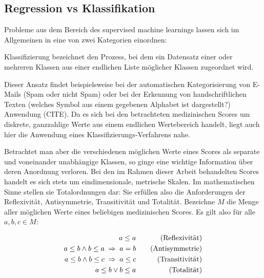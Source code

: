 \subsection{Regression vs Klassifikation}\label{section:regrvsclf}
Probleme aus dem Bereich des supervised machine learnings lassen sich im Allgemeinen in eine von zwei Kategorien einordnen:

Klassifizierung bezeichnet den Prozess, bei dem ein Datensatz einer oder mehreren Klassen aus einer endlichen Liste möglicher Klassen zugeordnet wird. 

Dieser Ansatz findet beispielsweise bei der automatischen Kategorisierung von E-Mails (Spam oder nicht Spam) oder bei der Erkennung von handschriftlichen Texten (welches Symbol aus einem gegebenen Alphabet ist dargestellt?) Anwendung (CITE). 
Da es sich bei den betrachteten medizinischen Scores um diskrete, ganzzahlige Werte aus einem endlichen Wertebereich handelt, liegt auch hier die Anwendung eines Klassifizierungs-Verfahrens nahe.

Betrachtet man aber die verschiedenen möglichen Werte eines Scores als separate und voneinander unabhängige Klassen, so ginge eine wichtige Information über deren Anordnung verloren. Bei den im Rahmen dieser Arbeit behandelten Scores handelt es sich stets um eindimensionale, metrische Skalen. Im mathematischen Sinne stellen sie Totalordnungen dar: Sie erfüllen also die Anforderungen der Reflexivität, Antisymmetrie, Transitivität und Totalität. Bezeichne $M$ die Menge aller möglichen Werte eines beliebigen medizinischen Scores. Es gilt also für alle $a,b,c \in M$:

\begin{equation*}
    \centering
    \begin{aligned}[c]
        a \leq a\\
        a \leq b \land b \leq a \; \Rightarrow \; a=b\\
        a \leq b \land b \leq c \; \Rightarrow \; a \leq c\\
        a \leq b \lor b \leq a
    \end{aligned}
    \qquad
    \begin{aligned}[c]
        \text{(Reflexivität)}\\
        \text{(Antisymmetrie)}\\
        \text{(Transitivität)}\\
        \text{(Totalität)}
    \end{aligned}
\end{equation*}

